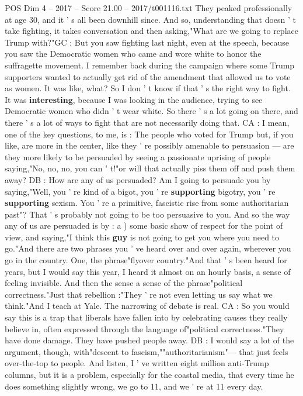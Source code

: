 \begin{textsample}{POS Dim 4 – 2017 – Score 21.00 – 2017/t001116.txt}
They peaked professionally at age 30, and it ' s all been downhill since.
And so, understanding that doesn ' t take fighting, it takes conversation and then asking,"What are we going to replace Trump with?"GC : But you saw fighting last night, even at the speech, because you saw the Democratic women who came and wore white to honor the suffragette movement.
I remember back during the campaign where some Trump supporters wanted to actually get rid of the amendment that allowed us to vote as women.
It was like, what?
So I don ' t know if that ' s the right way to fight.
It was \textbf{interesting}, because I was looking in the audience, trying to see Democratic women who didn ' t wear white.
So there ' s a lot going on there, and there ' s a lot of ways to fight that are not necessarily doing that.
CA : I mean, one of the key questions, to me, is : The people who voted for Trump but, if you like, are more in the center, like they ' re possibly amenable to persuasion — are they more likely to be persuaded by seeing a passionate uprising of people saying,"No, no, no, you can ' t!"or will that actually piss them off and push them away?
DB : How are any of us persuaded?
Am I going to persuade you by saying,"Well, you ' re kind of a bigot, you ' re \textbf{supporting} bigotry, you ' re \textbf{supporting} sexism.
You ' re a primitive, fascistic rise from some authoritarian past"?
That ' s probably not going to be too persuasive to you.
And so the way any of us are persuaded is by : a ) some basic show of respect for the point of view, and saying,"I think this \textbf{guy} is not going to get you where you need to go."And there are two phrases you ' ve heard over and over again, wherever you go in the country.
One, the phrase"flyover country."And that ' s been heard for years, but I would say this year, I heard it almost on an hourly basis, a sense of feeling invisible.
And then the sense a sense of the phrase"political correctness."Just that rebellion :"They ' re not even letting us say what we think."And I teach at Yale.
The narrowing of debate is real.
CA : So you would say this is a trap that liberals have fallen into by celebrating causes they really believe in, often expressed through the language of"political correctness."They have done damage.
They have pushed people away.
DB : I would say a lot of the argument, though, with"descent to fascism,""authoritarianism"— that just feels over-the-top to people.
And listen, I ' ve written eight million anti-Trump columns, but it is a problem, especially for the coastal media, that every time he does something slightly wrong, we go to 11, and we ' re at 11 every day.

\end{textsample}
